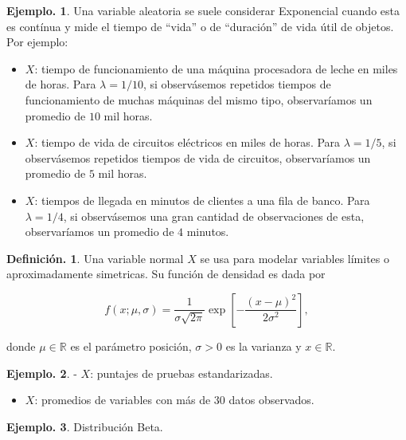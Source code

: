 \documentclass[]{book}
\providecommand{\tightlist}{%
  \setlength{\itemsep}{0pt}\setlength{\parskip}{0pt}}
\theoremstyle{definition}
\newtheorem{definition}{Definición.}[chapter]
\theoremstyle{definition}
\newtheorem{example}{Ejemplo.}[chapter]
\theoremstyle{definition}
\theoremstyle{remark}
\begin{document}
\begin{example}
\protect\hypertarget{exm:unnamed-chunk-148}{}{\label{exm:unnamed-chunk-148} }
Una variable aleatoria se suele considerar Exponencial cuando esta
es contínua y mide el tiempo de ``vida'' o de ``duración'' de vida
útil de objetos. Por ejemplo:

\begin{itemize}
\item
  \(X\): tiempo de funcionamiento de una máquina procesadora
  de leche en miles de horas. Para \(\lambda= 1/10\), si
  observásemos repetidos tiempos de funcionamiento de
  muchas máquinas del mismo tipo, observaríamos un promedio
  de \(10\) mil horas.
\item
  \(X\): tiempo de vida de circuitos eléctricos en miles de horas.
  Para \(\lambda=1/5\), si observásemos repetidos
  tiempos de vida de circuitos, observaríamos un promedio
  de \(5\) mil horas.
\item
  \(X\): tiempos de llegada en minutos de clientes a una fila de
  banco. Para \(\lambda= 1/4\), si observásemos una gran
  cantidad de observaciones de esta, observaríamos un
  promedio de \(4\) minutos.
\end{itemize}
\end{example}

\begin{definition}
\protect\hypertarget{def:unnamed-chunk-149}{}{\label{def:unnamed-chunk-149} }
Una variable normal \(X\) se usa para modelar variables límites o
aproximadamente simetricas. Su función de densidad es dada por

\[ f(x;\mu, \sigma) =
\frac{1}{\sigma\sqrt{2\pi}}\exp\left[-\frac{(x -
\mu)^2}{2\sigma^2}  \right],  \]

donde \(\mu \in \mathbb{R}\) es el parámetro posición,
\(\sigma>0\) es la varianza y \(x\in \mathbb{R}\).
\end{definition}

\begin{example}
\protect\hypertarget{exm:unnamed-chunk-150}{}{\label{exm:unnamed-chunk-150} }
- \(X\): puntajes de pruebas estandarizadas.

\begin{itemize}
\tightlist
\item
  \(X\): promedios de variables con más de \(30\) datos observados.
\end{itemize}
\end{example}

\begin{example}
\protect\hypertarget{exm:unnamed-chunk-151}{}{\label{exm:unnamed-chunk-151} }Distribución Beta.
\end{example}
\end{document}
